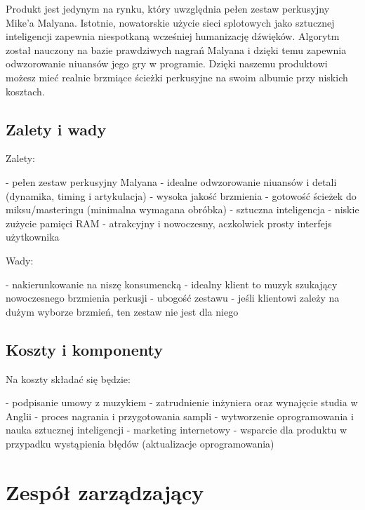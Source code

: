 \documentclass[12pt]{article}
\begin{document}
Produkt jest jedynym na rynku, który uwzględnia pełen zestaw perkusyjny Mike'a
Malyana. Istotnie, nowatorskie użycie sieci splotowych jako sztucznej
inteligencji zapewnia niespotkaną wcześniej humanizację dźwięków. Algorytm
został nauczony na bazie prawdziwych nagrań Malyana i dzięki temu zapewnia
odwzorowanie niuansów jego gry w programie. Dzięki naszemu produktowi możesz
mieć realnie brzmiące ścieżki perkusyjne na swoim albumie przy niskich
kosztach.

\subsection{Zalety i wady}

Zalety:

- pełen zestaw perkusyjny Malyana
- idealne odwzorowanie niuansów i detali (dynamika, timing i artykulacja)
- wysoka jakość brzmienia
- gotowość ścieżek do miksu/masteringu (minimalna wymagana obróbka)
- sztuczna inteligencja
- niskie zużycie pamięci RAM
- atrakcyjny i nowoczesny, aczkolwiek prosty interfejs użytkownika

Wady:

- nakierunkowanie na niszę konsumencką - idealny klient to muzyk szukający
  nowoczesnego brzmienia perkusji
- ubogość zestawu - jeśli klientowi zależy na dużym wyborze brzmień, ten zestaw
  nie jest dla niego

\subsection{Koszty i komponenty}

Na koszty składać się będzie:

- podpisanie umowy z muzykiem
- zatrudnienie inżyniera oraz wynajęcie studia w Anglii
- proces nagrania i przygotowania sampli
- wytworzenie oprogramowania i nauka sztucznej inteligencji
- marketing internetowy
- wsparcie dla produktu w przypadku wystąpienia błędów (aktualizacje
  oprogramowania)

\section{Zespół zarządzający}

\end{document}
